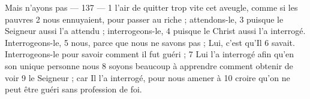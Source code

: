 Mais n'ayons pas	 
 	--- 137 ---	 
1	 	l'air de quitter trop vite cet aveugle, comme si les pauvres	 
2	 	nous ennuyaient, pour passer au riche ; attendons-le,	 
3	 	puisque le Seigneur aussi l'a attendu ; interrogeons-le,	 
4	 	puisque le Christ aussi l'a interrogé. Interrogeons-le,	 
5	 	nous, parce que nous ne savons pas ; Lui, c'est qu'Il	 
6	 	savait. Interrogeons-le pour savoir comment il fut guéri ;	 
7	 	Lui l'a interrogé afin qu'en son unique personne nous	 
8	 	soyons beaucoup à apprendre comment obtenir de voir	 
9	 	le Seigneur ; car Il l'a interrogé, pour nous amener à	 
10	 	croire qu'on ne peut être guéri sans profession de foi.